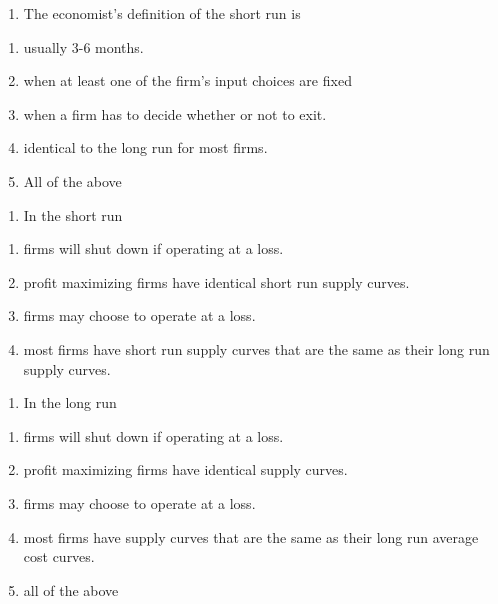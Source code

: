 \documentclass[11pt,]{article}
\providecommand{\tightlist}{%
  \setlength{\itemsep}{0pt}\setlength{\parskip}{0pt}}
\begin{document}
\begin{enumerate}
\def\labelenumi{\arabic{enumi})}
\setcounter{enumi}{14}
\tightlist
\item
  The economist's definition of the short run is
\end{enumerate}

\begin{enumerate}
\def\labelenumi{\Alph{enumi})}
\tightlist
\item
  usually 3-6 months.
\item
  when at least one of the firm's input choices are fixed
\item
  when a firm has to decide whether or not to exit.
\item
  identical to the long run for most firms.
\item
  All of the above
\end{enumerate}

\begin{enumerate}
\def\labelenumi{\arabic{enumi})}
\setcounter{enumi}{15}
\tightlist
\item
  In the short run
\end{enumerate}

\begin{enumerate}
\def\labelenumi{\Alph{enumi})}
\tightlist
\item
  firms will shut down if operating at a loss.
\item
  profit maximizing firms have identical short run supply curves.
\item
  firms may choose to operate at a loss.
\item
  most firms have short run supply curves that are the same as their
  long run supply curves.
\end{enumerate}

\begin{enumerate}
\def\labelenumi{\arabic{enumi})}
\setcounter{enumi}{15}
\tightlist
\item
  In the long run
\end{enumerate}

\begin{enumerate}
\def\labelenumi{\Alph{enumi})}
\tightlist
\item
  firms will shut down if operating at a loss.
\item
  profit maximizing firms have identical supply curves.
\item
  firms may choose to operate at a loss.
\item
  most firms have supply curves that are the same as their long run
  average cost curves.
\item
  all of the above
\end{enumerate}
\end{document}
